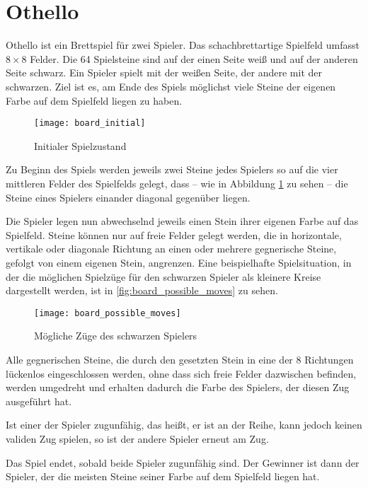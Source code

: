 \section{Othello}
\label{sec:othello}

Othello ist ein Brettspiel für zwei Spieler. Das schachbrettartige Spielfeld umfasst $8\times 8$ Felder. Die 64 Spielsteine sind auf der einen Seite weiß und auf der anderen Seite schwarz. Ein Spieler spielt mit der weißen Seite, der andere mit der schwarzen. Ziel ist es, am Ende des Spiels möglichst viele Steine der eigenen Farbe auf dem Spielfeld liegen zu haben.

\begin{figure}[H]
    \centering
    \texttt{[image: board\_initial]}
    \caption{Initialer Spielzustand}
    \label{fig:board_initial}
\end{figure}

Zu Beginn des Spiels werden jeweils zwei Steine jedes Spielers so auf die vier mittleren Felder des Spielfelds gelegt, dass
– wie in Abbildung \ref{fig:board_initial} zu sehen – die Steine eines Spielers einander diagonal gegenüber liegen.

Die Spieler legen nun abwechselnd jeweils einen Stein ihrer eigenen Farbe auf das Spielfeld. Steine können nur auf freie
Felder gelegt werden, die in horizontale, vertikale oder diagonale Richtung an einen oder mehrere gegnerische Steine,
gefolgt von einem eigenen Stein, angrenzen. Eine beispielhafte Spielsituation, in der die möglichen Spielzüge für den
schwarzen Spieler als kleinere Kreise dargestellt werden, ist in \autoref{fig:board_possible_moves} zu sehen. 

\begin{figure}[H]
    \centering
    \texttt{[image: board\_possible\_moves]}
    \caption{Mögliche Züge des schwarzen Spielers}
    \label{fig:board_possible_moves}
\end{figure}

Alle gegnerischen Steine, die durch den gesetzten Stein in eine der 8 Richtungen lückenlos eingeschlossen werden, ohne dass sich freie Felder dazwischen befinden, werden umgedreht und erhalten dadurch die Farbe des Spielers, der diesen Zug ausgeführt hat.

Ist einer der Spieler zugunfähig, das heißt, er ist an der Reihe, kann jedoch keinen validen Zug spielen, so ist der
andere Spieler erneut am Zug.

Das Spiel endet, sobald beide Spieler zugunfähig sind. Der Gewinner ist dann der Spieler, der die meisten Steine seiner
Farbe auf dem Spielfeld liegen hat.
\cite{worldothellorules}
